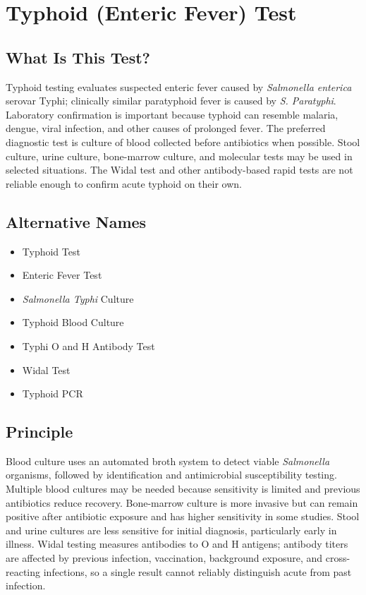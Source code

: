 \chapter{Typhoid (Enteric Fever) Test}

\section*{What Is This Test?}
Typhoid testing evaluates suspected enteric fever caused by \textit{Salmonella enterica} serovar Typhi; clinically similar paratyphoid fever is caused by \textit{S. Paratyphi}. Laboratory confirmation is important because typhoid can resemble malaria, dengue, viral infection, and other causes of prolonged fever. The preferred diagnostic test is culture of blood collected before antibiotics when possible. Stool culture, urine culture, bone-marrow culture, and molecular tests may be used in selected situations. The Widal test and other antibody-based rapid tests are not reliable enough to confirm acute typhoid on their own.

\section*{Alternative Names}
\begin{itemize}
  \item Typhoid Test
  \item Enteric Fever Test
  \item \textit{Salmonella Typhi} Culture
  \item Typhoid Blood Culture
  \item Typhi O and H Antibody Test
  \item Widal Test
  \item Typhoid PCR
\end{itemize}
\section*{Principle}
Blood culture uses an automated broth system to detect viable \textit{Salmonella} organisms, followed by identification and antimicrobial susceptibility testing. Multiple blood cultures may be needed because sensitivity is limited and previous antibiotics reduce recovery. Bone-marrow culture is more invasive but can remain positive after antibiotic exposure and has higher sensitivity in some studies. Stool and urine cultures are less sensitive for initial diagnosis, particularly early in illness. Widal testing measures antibodies to O and H antigens; antibody titers are affected by previous infection, vaccination, background exposure, and cross-reacting infections, so a single result cannot reliably distinguish acute from past infection.

